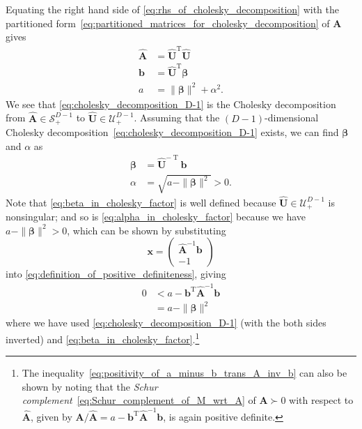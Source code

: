 \documentclass[12pt,a4paper]{article}
\begin{document}
Equating the right hand side of \eqref{eq:rhs_of_cholesky_decomposition} with
the partitioned form~\eqref{eq:partitioned_matrices_for_cholesky_decomposition} of $\mathbf{A}$
gives
\begin{align}
\widehat{\mathbf{A}} &= \widehat{\mathbf{U}}^{\operatorname{T}} \widehat{\mathbf{U}}
\label{eq:cholesky_decomposition_D-1} \\
\mathbf{b} &= \widehat{\mathbf{U}}^{\operatorname{T}} \bm{\beta} \\
a &= \|\bm{\beta}\|^{2} + \alpha^{2} .
\end{align}
We see that \eqref{eq:cholesky_decomposition_D-1} is
the Cholesky decomposition from $\widehat{\mathbf{A}} \in \mathcal{S}_{+}^{D - 1}$
to $\widehat{\mathbf{U}} \in \mathcal{U}_{+}^{D - 1}$.
Assuming that
the $(D - 1)$-dimensional Cholesky decomposition~\eqref{eq:cholesky_decomposition_D-1} exists,
we can find $\bm{\beta}$ and $\alpha$ as
\begin{align}
\bm{\beta} &= \widehat{\mathbf{U}}^{-\operatorname{T}} \mathbf{b}
\label{eq:beta_in_cholesky_factor} \\
\alpha &= \sqrt{a - \|\bm{\beta}\|^{2}} > 0
\label{eq:alpha_in_cholesky_factor} .
\end{align}
Note that \eqref{eq:beta_in_cholesky_factor} is well defined because
$\widehat{\mathbf{U}} \in \mathcal{U}_{+}^{D - 1}$ is nonsingular; and
so is \eqref{eq:alpha_in_cholesky_factor} because we have $a - \|\bm{\beta}\|^{2} > 0$,
which can be shown by substituting
\begin{equation}
\mathbf{x} =
\begin{pmatrix}
\widehat{\mathbf{A}}^{-1} \mathbf{b} \\
-1
\end{pmatrix}
\end{equation}
into \eqref{eq:definition_of_positive_definiteness}, giving
\begin{align}
0 &< a - \mathbf{b}^{\operatorname{T}} \widehat{\mathbf{A}}^{-1} \mathbf{b}
\label{eq:positivity_of_a_minus_b_trans_A_inv_b} \\
&= a - \|\bm{\beta}\|^{2}
\end{align}
where we have used \eqref{eq:cholesky_decomposition_D-1} (with the both sides inverted) and
\eqref{eq:beta_in_cholesky_factor}.\footnote{%
The inequality~\eqref{eq:positivity_of_a_minus_b_trans_A_inv_b} can also be shown by noting that
the \emph{Schur complement}~\eqref{eq:Schur_complement_of_M_wrt_A}
of $\mathbf{A} \succ 0$ with respect to $\widehat{\mathbf{A}}$, given by
$\mathbf{A}/\widehat{\mathbf{A}}
= a - \mathbf{b}^{\operatorname{T}} \widehat{\mathbf{A}}^{-1} \mathbf{b}$,
is again positive definite.}
\end{document}
